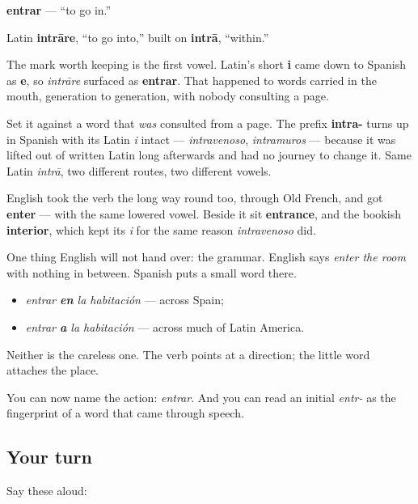 \begin{cousinweb}
\textbf{entrar} — \textquotedblleft{}to go in.\textquotedblright{}

Latin \textbf{intrāre}, \textquotedblleft{}to go into,\textquotedblright{} built on \textbf{intrā}, \textquotedblleft{}within.\textquotedblright{}

The mark worth keeping is the first vowel. Latin's short \textbf{i} came down to Spanish as \textbf{e}, so \emph{intrāre} surfaced as \textbf{entrar}. That happened to words carried in the mouth, generation to generation, with nobody consulting a page.

Set it against a word that \emph{was} consulted from a page. The prefix \textbf{intra-} turns up in Spanish with its Latin \emph{i} intact — \emph{intravenoso}, \emph{intramuros} — because it was lifted out of written Latin long afterwards and had no journey to change it. Same Latin \emph{intrā}, two different routes, two different vowels.

English took the verb the long way round too, through Old French, and got \textbf{enter} — with the same lowered vowel. Beside it sit \textbf{entrance}, and the bookish \textbf{interior}, which kept its \emph{i} for the same reason \emph{intravenoso} did.

One thing English will not hand over: the grammar. English says \emph{enter the room} with nothing in between. Spanish puts a small word there.

\begin{itemize}
\raggedright
  \item \emph{entrar \textbf{en} la habitación} — across Spain;
  \item \emph{entrar \textbf{a} la habitación} — across much of Latin America.
\end{itemize}

Neither is the careless one. The verb points at a direction; the little word attaches the place.
\end{cousinweb}

\begin{grammarlens}[title={What you've built}]
You can now name the action: \emph{entrar}. And you can read an initial \emph{entr-} as the fingerprint of a word that came through speech.
\end{grammarlens}

\subsection*{Your turn}
Say these aloud:

